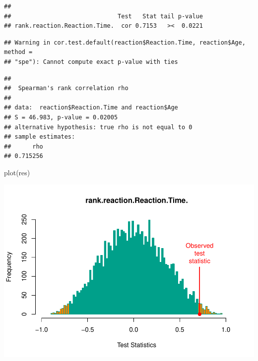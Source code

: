 \documentclass[
]{article}
\newenvironment{Shaded}{\begin{snugshade}}{\end{snugshade}}
\newcommand{\AttributeTok}[1]{\textcolor[rgb]{0.77,0.63,0.00}{#1}}
\newcommand{\FunctionTok}[1]{\textcolor[rgb]{0.00,0.00,0.00}{#1}}
\newcommand{\NormalTok}[1]{#1}
\newcommand{\SpecialCharTok}[1]{\textcolor[rgb]{0.00,0.00,0.00}{#1}}
\newcommand{\StringTok}[1]{\textcolor[rgb]{0.31,0.60,0.02}{#1}}
\begin{document}
\begin{verbatim}
## 
##                              Test   Stat tail p-value
## rank.reaction.Reaction.Time.  cor 0.7153   ><  0.0221
\end{verbatim}

\begin{Shaded}
\end{Shaded}

\begin{verbatim}
## Warning in cor.test.default(reaction$Reaction.Time, reaction$Age, method =
## "spe"): Cannot compute exact p-value with ties
\end{verbatim}

\begin{verbatim}
## 
##  Spearman's rank correlation rho
## 
## data:  reaction$Reaction.Time and reaction$Age
## S = 46.983, p-value = 0.02005
## alternative hypothesis: true rho is not equal to 0
## sample estimates:
##      rho 
## 0.715256
\end{verbatim}

\begin{Shaded}
\begin{Highlighting}[]
\FunctionTok{plot}\NormalTok{(res)}
\end{Highlighting}
\end{Shaded}

\begin{center}\includegraphics{perm_files/figure-latex/unnamed-chunk-22-1} \end{center}
\end{document}

